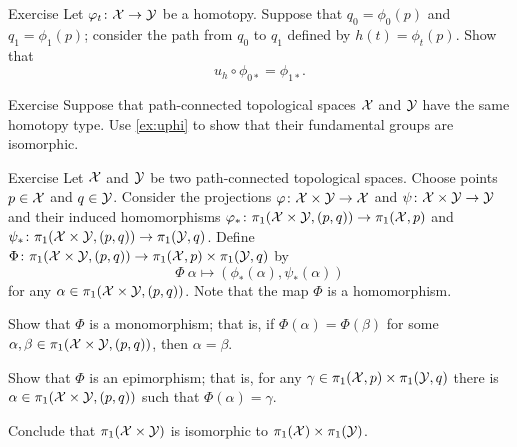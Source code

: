 \begin{thm}{Exercise}\label{ex:uphi}
Let $\varphi_t\colon\mathcal{X}\to\mathcal{Y}$ be a homotopy.
Suppose that $q_0=\phi_0(p)$ and $q_1=\phi_1(p)$; 
consider the path from $q_0$ to $q_1$ defined by $h(t)=\phi_t(p)$.
Show that 
\[u_h\circ \phi_{0*}=\phi_{1*}.\]
\end{thm}

\begin{thm}{Exercise}
Suppose that path-connected topological spaces $\mathcal{X}$ and $\mathcal{Y}$ have the same homotopy type.
Use \ref{ex:uphi} to show that their fundamental groups are isomorphic.
\end{thm}



\begin{thm}{Exercise}
Let $\mathcal{X}$ and $\mathcal{Y}$ be two path-connected topological spaces.
Choose points $p\in \mathcal{X}$ and $q\in \mathcal{Y}$.
Consider the projections $\varphi\colon\mathcal{X}\times\mathcal{Y}\to \mathcal{X}$ and $\psi\colon\mathcal{X}\times\mathcal{Y}\to \mathcal{Y}$
and their induced homomorphisms
$\varphi_*\colon\pi_1(\mathcal{X}\times\mathcal{Y},(p,q))\to \pi_1(\mathcal{X},p)$
and $\psi_*\colon\pi_1(\mathcal{X}\times\mathcal{Y},(p,q))\to \pi_1(\mathcal{Y},q)$.
Define $\Phi\colon\pi_1(\mathcal{X}\times\mathcal{Y},(p,q))\to \pi_1(\mathcal{X},p)\times \pi_1(\mathcal{Y},q)$ by
\[\Phi\:\alpha\mapsto (\phi_*(\alpha),\psi_*(\alpha))\]
for any $\alpha\in \pi_1(\mathcal{X}\times\mathcal{Y},(p,q))$.
Note that the map $\Phi$ is a homomorphism.

\begin{subthm}{}
Show that $\Phi$ is a monomorphism;
that is, if $\Phi(\alpha)=\Phi(\beta)$ for some $\alpha,\beta\in \pi_1(\mathcal{X}\times\mathcal{Y},(p,q))$, then 
$\alpha=\beta$.
\end{subthm}

\begin{subthm}{}
Show that $\Phi$ is an epimorphism;
that is, for any $\gamma\in \pi_1(\c{X},p)\z\times\pi_1(\c{Y},q)$ there is $\alpha\in\pi_1(\mathcal{X}\times\mathcal{Y},(p,q))$ such that $\Phi(\alpha)=\gamma$.
\end{subthm}

Conclude that $\pi_1(\mathcal{X}\times\mathcal{Y})$ is isomorphic to $\pi_1(\mathcal{X})\times\pi_1(\mathcal{Y})$.
\end{thm}
